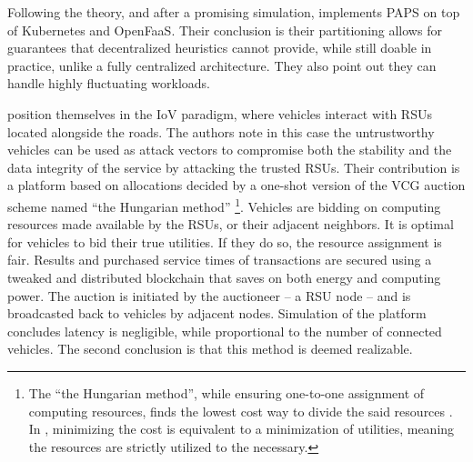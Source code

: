 \documentclass[11pt]{sdm}
\begin{document}
\begin{description}
	Following the theory, and after a promising simulation, \citet{baresi_paps_2021} implements \gls{PAPS} on top of Kubernetes and OpenFaaS. Their conclusion is their partitioning allows for guarantees that decentralized heuristics cannot provide, while still doable in practice, unlike a fully centralized architecture. They also point out they can handle highly fluctuating workloads.
	
	\item[\citet{lee_trustful_2020}] position themselves in the \gls{IoV} paradigm, where vehicles interact with \glspl{RSU} located alongside the roads. The authors note in this case the untrustworthy vehicles can be used as attack vectors to compromise both the stability and the data integrity of the service by attacking the trusted \glspl{RSU}. Their contribution is a platform based on allocations decided by a one-shot version of the \gls{VCG} auction scheme named ``the Hungarian method'' \footnote{The ``the Hungarian method'', while ensuring one-to-one assignment of computing resources, finds the lowest cost way to divide the said resources \cite{wikipedia_hungarian_2021}. In \cite{lee_trustful_2020}, minimizing the cost is equivalent to a minimization of utilities, meaning the resources are strictly utilized to the necessary.}. Vehicles are bidding on computing resources made available by the \glspl{RSU}, or their adjacent neighbors. It is optimal for vehicles to bid their true utilities. If they do so, the resource assignment is fair. Results and purchased service times of transactions are secured using a tweaked and distributed blockchain that saves on both energy and computing power. The auction is initiated by the auctioneer -- a \gls{RSU} node -- and is broadcasted back to vehicles by adjacent nodes. Simulation of the platform concludes latency is negligible, while proportional to the number of connected vehicles. The second conclusion is that this method is deemed realizable.
	

\end{description}
\end{document}
